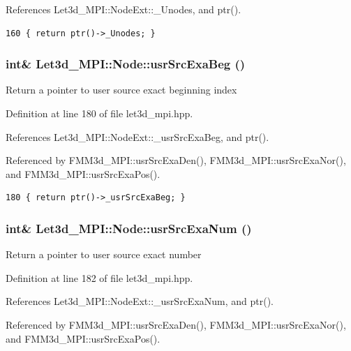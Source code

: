 References Let3d\_\-MPI::Node\-Ext::\_\-Unodes, and ptr().

\footnotesize\begin{verbatim}160 { return ptr()->_Unodes; }
\end{verbatim}\normalsize 


\subsubsection{\setlength{\rightskip}{0pt plus 5cm}int\& Let3d\_\-MPI::Node::usr\-Src\-Exa\-Beg ()\hspace{0.3cm}{\tt  [inline]}}\label{classLet3d__MPI_1_1Node_406e6502fa2f065633d5bf5acb0ab47d_406e6502fa2f065633d5bf5acb0ab47d}


Return a pointer to user source exact beginning index 

Definition at line 180 of file let3d\_\-mpi.hpp.

References Let3d\_\-MPI::Node\-Ext::\_\-usr\-Src\-Exa\-Beg, and ptr().

Referenced by FMM3d\_\-MPI::usr\-Src\-Exa\-Den(), FMM3d\_\-MPI::usr\-Src\-Exa\-Nor(), and FMM3d\_\-MPI::usr\-Src\-Exa\-Pos().

\footnotesize\begin{verbatim}180 { return ptr()->_usrSrcExaBeg; }
\end{verbatim}\normalsize 


\subsubsection{\setlength{\rightskip}{0pt plus 5cm}int\& Let3d\_\-MPI::Node::usr\-Src\-Exa\-Num ()\hspace{0.3cm}{\tt  [inline]}}\label{classLet3d__MPI_1_1Node_01c4cc2952d8769220afca86f7ef4e39_01c4cc2952d8769220afca86f7ef4e39}


Return a pointer to user source exact number 

Definition at line 182 of file let3d\_\-mpi.hpp.

References Let3d\_\-MPI::Node\-Ext::\_\-usr\-Src\-Exa\-Num, and ptr().

Referenced by FMM3d\_\-MPI::usr\-Src\-Exa\-Den(), FMM3d\_\-MPI::usr\-Src\-Exa\-Nor(), and FMM3d\_\-MPI::usr\-Src\-Exa\-Pos().

